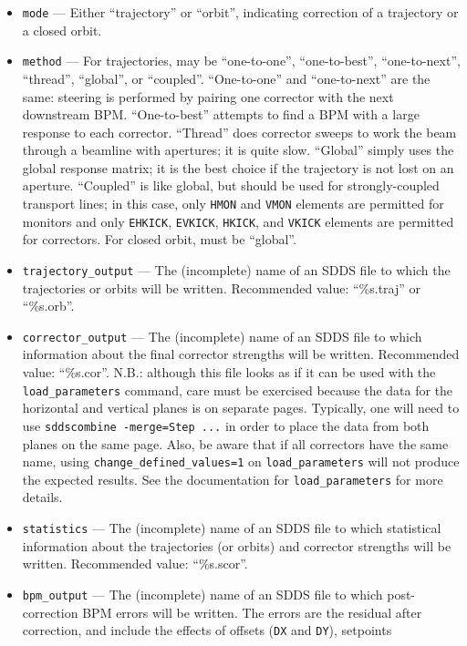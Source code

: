 \documentclass[11pt]{article}
\begin{document}
\begin{itemize}

\item \verb|mode| --- Either ``trajectory'' or ``orbit'', indicating
correction of a trajectory or a closed orbit.
\item \verb|method| --- For trajectories, may be ``one-to-one'', ``one-to-best'', ``one-to-next'', ``thread'', ``global'',
  or ``coupled''.
``One-to-one'' and ``one-to-next'' are the same: steering is performed by pairing one corrector with the next downstream BPM.
``One-to-best'' attempts to find a BPM with a large response to each corrector.  ``Thread'' does corrector sweeps to work the
beam through a beamline with apertures; it is quite slow.  ``Global'' simply uses the global response matrix; it is the best
choice if the trajectory is not lost on an aperture. ``Coupled'' is like global, but should be used for strongly-coupled
transport lines; in this case, only \verb|HMON| and \verb|VMON| elements are permitted for monitors and only
\verb|EHKICK|, \verb|EVKICK|, \verb|HKICK|, and \verb|VKICK| elements are permitted for correctors.
For closed orbit, must be ``global''.
\item \verb|trajectory_output| --- The (incomplete) name of an SDDS file to which the trajectories or orbits will be written.  Recommended value: ``\%s.traj'' or ``\%s.orb''.  
\item \verb|corrector_output| --- The (incomplete) name of an SDDS file to which information about the final corrector strengths will be written. Recommended value: ``\%s.cor''.  N.B.: although this file looks as if it can be used with the \verb|load_parameters| command, care must be exercised because the data for the
horizontal and vertical planes is on separate pages. Typically, one will need to use \verb|sddscombine -merge=Step ...| in order to place the data from both planes on the same page. Also, be aware that if all correctors have the same name, using \verb|change_defined_values=1| on \verb|load_parameters| will not produce the expected results. See the documentation for \verb|load_parameters| for more details.
\item \verb|statistics| --- The (incomplete) name of an SDDS file to which statistical information about the
trajectories (or orbits) and corrector strengths will be written.  Recommended value: ``\%s.scor''.
\item \verb|bpm_output| --- The (incomplete) name of an SDDS file to which post-correction BPM errors will be written. The
  errors are the residual after correction, and include the effects of offsets (\verb|DX| and \verb|DY|), setpoints

\end{itemize}
\end{document}
